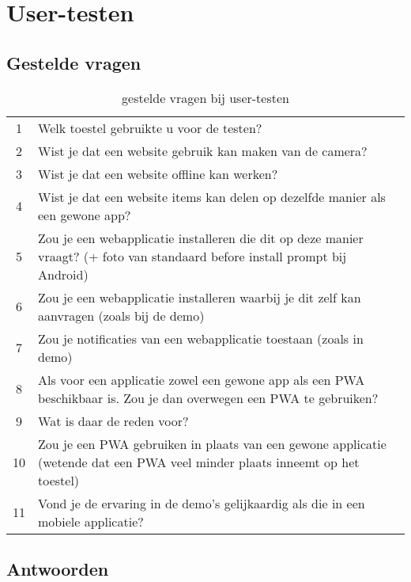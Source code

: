 \chapter{User-testen }
\label{ch:userTesten}

\section{Gestelde vragen}

\begin{table}[H]
	\centering
	\begin{tabular}{cp{12cm}}
		1 &  Welk toestel gebruikte u voor de testen? \\
		2 &  Wist je dat een website gebruik kan maken van de camera? \\
		3 &  Wist je dat een website offline kan werken? \\
		4 &  Wist je dat een website items kan delen op dezelfde manier als een gewone app?\\
		5 &  Zou je een webapplicatie installeren die dit op deze manier vraagt?  (+ foto van standaard before install prompt bij Android) \\
		6 &  Zou je een webapplicatie installeren waarbij je dit zelf kan aanvragen (zoals bij de demo) \\
		7 &  Zou je notificaties van een webapplicatie toestaan (zoals in demo) \\
		8 &  Als voor een applicatie zowel een gewone app als een PWA beschikbaar is. Zou je dan overwegen een PWA te gebruiken? \\
		9 &  Wat is daar de reden voor?  \\
		10 &  Zou je een PWA gebruiken in plaats van een gewone applicatie (wetende dat een PWA veel minder plaats inneemt op het toestel) \\
		11 &  Vond je de ervaring in de demo's gelijkaardig als die in een mobiele applicatie? \\
	\end{tabular}	
	\caption{gestelde vragen bij user-testen}
\end{table}

\section{Antwoorden}

